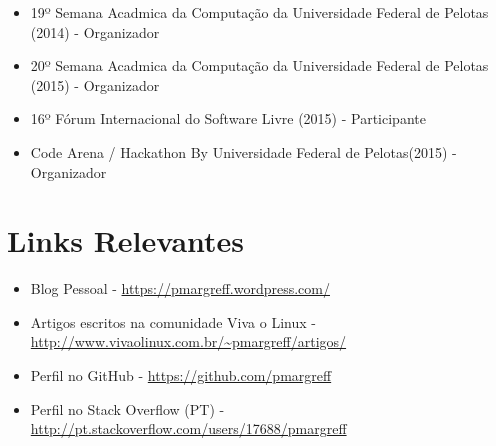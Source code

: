 \documentclass[11pt,a4paper,sans]{moderncv}        %
\begin{document}
\begin{itemize}

\item{19º Semana Acadmica da Computação da Universidade Federal de Pelotas (2014) - Organizador}
\item{20º Semana Acadmica da Computação da Universidade Federal de Pelotas (2015)  - Organizador}
\item{16º Fórum Internacional do Software Livre (2015) - Participante}
\item{Code Arena / Hackathon By Universidade Federal de Pelotas(2015) - Organizador}
\end{itemize}

\section{Links Relevantes}

\vspace{6pt}
 
\begin{itemize}

\item{Blog Pessoal - \href{https://pmargreff.wordpress.com/}{https://pmargreff.wordpress.com/}}

\item{Artigos escritos na comunidade Viva o Linux  - \href{http://www.vivaolinux.com.br/~pmargreff/artigos/}{http://www.vivaolinux.com.br/\~{}pmargreff/artigos/}}

\item{Perfil no GitHub - \href{https://github.com/pmargreff}{https://github.com/pmargreff}}

\item{Perfil no Stack Overflow (PT) - \href{http://pt.stackoverflow.com/users/17688/pmargreff}{http://pt.stackoverflow.com/users/17688/pmargreff}}

\end{itemize}


\nocite{*}



\end{document}
